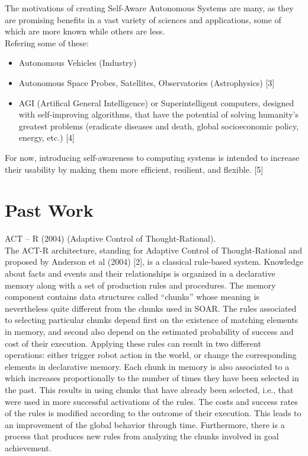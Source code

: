 \documentclass{amsbook}
\begin{document}
{The motivations of creating Self-Aware Autonomous Systems are many, as they are promising benefits in a vast variety of sciences and applications, some of which are more known while others are less. \\
Refering some of these:
\begin{itemize}
    \item Autonomous Vehicles (Industry)
    \item Autonomous Space Probes, Satellites, Observatories (Astrophysics) [3]
    \item AGI (Artifical General Intelligence) or Superintelligent computers, designed with self-improving algorithms, that have the potential of solving humanity's greatest problems (eradicate diseases and death, global socioeconomic policy, energy, etc.) [4]
\end{itemize}
For now, introducing self-awareness to computing systems is intended to increase their usability by making them more efﬁcient, resilient, and ﬂexible. [5]
\clearpage
\huge{\section{Past Work}}
ACT – R (2004) (Adaptive Control of Thought-Rational).\\
The ACT-R architecture, standing for Adaptive Control of Thought-Rational and proposed by Anderson et al (2004) [2], is a classical rule-based system. Knowledge about facts and events and their relationships is organized in a declarative memory along with a set of production rules and procedures. The memory component contains data structures called “chunks” whose meaning is nevertheless quite diﬀerent from the chunks used in SOAR. The rules associated to selecting particular chunks depend ﬁrst on the existence of matching elements in memory, and second also depend on the estimated probability of success and cost of their execution. Applying these rules can result in two diﬀerent operations: either trigger robot action in the world, or change the corresponding elements in declarative memory. Each chunk in memory is also associated to a  which increases proportionally to the number of times they have been selected in the past. This results in using chunks that have already been selected, i.e., that were used in more successful activations of the rules. The costs and success rates of the rules is modiﬁed according to the outcome of their execution. This leads to an improvement of the global behavior through time. Furthermore, there is a  process that produces new rules from analyzing the chunks involved in goal achievement. \\\\
}
\end{document}
